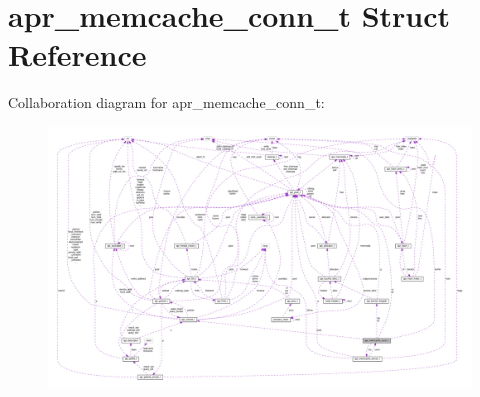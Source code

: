 \hypertarget{structapr__memcache__conn__t}{}\section{apr\+\_\+memcache\+\_\+conn\+\_\+t Struct Reference}
\label{structapr__memcache__conn__t}


Collaboration diagram for apr\+\_\+memcache\+\_\+conn\+\_\+t\+:
\nopagebreak
\begin{figure}[H]
\begin{center}
\leavevmode
\includegraphics[width=350pt]{structapr__memcache__conn__t__coll__graph}
\end{center}
\end{figure}
